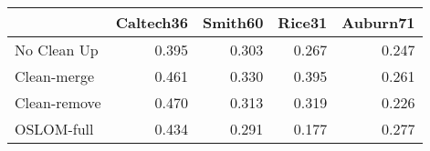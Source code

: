 \begin{tabular}{lrrrr}
\toprule
{} & Caltech36 & Smith60 & Rice31 & Auburn71 \\
\midrule
No Clean Up  &     0.395 &   0.303 &  0.267 &    0.247 \\
Clean-merge  &     0.461 &   0.330 &  0.395 &    0.261 \\
Clean-remove &     0.470 &   0.313 &  0.319 &    0.226 \\
OSLOM-full   &     0.434 &   0.291 &  0.177 &    0.277 \\
\bottomrule
\end{tabular}
